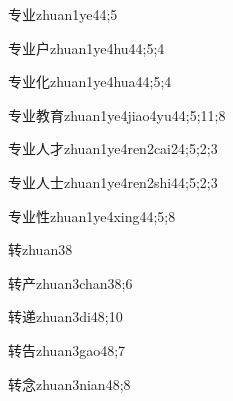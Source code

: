 \begin{verbete}{专业}{zhuan1ye4}{4;5}
\end{verbete}

\begin{verbete}{专业户}{zhuan1ye4hu4}{4;5;4}
\end{verbete}

\begin{verbete}{专业化}{zhuan1ye4hua4}{4;5;4}
\end{verbete}

\begin{verbete}{专业教育}{zhuan1ye4jiao4yu4}{4;5;11;8}
\end{verbete}

\begin{verbete}{专业人才}{zhuan1ye4ren2cai2}{4;5;2;3}
\end{verbete}

\begin{verbete}{专业人士}{zhuan1ye4ren2shi4}{4;5;2;3}
\end{verbete}

\begin{verbete}{专业性}{zhuan1ye4xing4}{4;5;8}
\end{verbete}

\begin{verbete}{转}{zhuan3}{8}
\end{verbete}

\begin{verbete}{转产}{zhuan3chan3}{8;6}
\end{verbete}

\begin{verbete}{转递}{zhuan3di4}{8;10}
\end{verbete}

\begin{verbete}{转告}{zhuan3gao4}{8;7}
\end{verbete}

\begin{verbete}{转念}{zhuan3nian4}{8;8}
\end{verbete}

